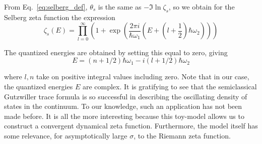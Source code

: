 \documentclass[11pt]{article}
\theoremstyle{plain}
\begin{document}
From Eq.~\eqref{eq:selberg_def}, $\theta_s$ is the same as $-\Im \ln \zeta_s$, so we obtain for the Selberg zeta function the expression
\begin{equation}
\zeta_s(E) = \prod_{l=0}^{\infty} \left( 1 + \exp\left( \frac{2\pi i}{\hbar\omega_1}\left( E + \left(l + \frac{1}{2}\right)\hbar\omega_2 \right) \right) \right)
\label{eq:selberg_zeta}
\end{equation}

The quantized energies are obtained by setting this equal to zero, giving
\begin{equation}
E = (n + 1/2)\hbar\omega_1 - i(l + 1/2)\hbar\omega_2
\label{eq:quantized_energies}
\end{equation}

where $l, n$ take on positive integral values including zero. Note that in our case, the quantized energies $E$ are complex. It is gratifying to see that the semiclassical Gutzwiller trace formula is so successful in describing the oscillating density of states in the continuum. To our knowledge, such an application has not been made before. It is all the more interesting because this toy-model allows us to construct a convergent dynamical zeta function. Furthermore, the model itself has some relevance, for asymptotically large $\sigma$, to the Riemann zeta function.
\end{document}
